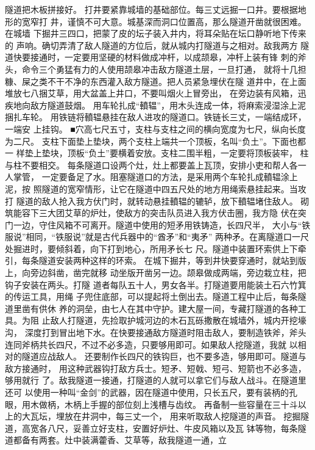 \documentclass[12pt,UTF8]{ctexbook}
\begin{document}
隧道把木板拼接好。 
打井要紧靠城墙的基础部位。每三丈远掘一口井。要根据地形的宽窄打 
井，谨慎不可大意。城基深而洞口位置高，那么隧道开凿就很困难。在城墙 
下掘井三四口，把蒙了皮的坛子装入井内，将耳朵贴在坛口静听地下传来的 
声响。确切弄清了敌人隧道的方位后，就从城内打隧道与之相对。敌我两方 
隧道快要接通时，一定要用坚硬的材料做成冲杆，以成颉皋，冲杆上装有锋 
刺的斧头，命令三个勇猛有力的人使用颉皋冲击敌方隧道土层，一旦打通， 
就将十几担糠、屎之类不干不净的东西灌入敌方隧道。把人员紧急埋伏在隧 
道井中，在上面堆放七八捆艾草，用大盆盖上井口，不要叫烟火上冒旁出， 
在旁边装有风箱，迅疾地向敌方隧道鼓烟。 
用车轮扎成“轒辒”，用木头连成一体，将麻索浸湿涂上泥捆扎车轮。 
用铁链将轒辒悬挂在敌人进攻的隧道口。铁链长三丈，一端结成环，一端安 
上挂钩。 
■穴高七尺五寸，支柱与支柱之间的横向宽度为七尺，纵向长度为二尺。 
支柱下面垫上垫块，两个支柱上端共一个顶板，名叫“负土”。下面也都一 
样垫上垫块，顶板“负土”要横着安放。支柱二围半粗，一定要将顶板装牢， 
柱与柱不要相交。 
每条隧道口设两个灶，灶上都要盖上瓦顶，安排小吏和帮人各一人掌管， 
一定要备足了水。阻塞隧道口的方法，是采用两个车轮扎成轒辒涂上泥，按 
照隧道的宽窄情形，让它在隧道中四五尺处的地方用绳索悬挂起来。当攻打 
隧道的敌人抢入我方伏门时，就转动悬挂轒辒的辘轳，放下轒辒堵住敌人。 
砌筑能容下三大团艾草的炉灶，使敌方的突击队员进入我方伏击圈，我方隐 
伏在突门一边，守住风箱不可离开。隧道中使用的短矛用铁铸造，长四尺半， 
大小与“铁服说”相同，“铁服说”就是古代兵器中的“酋矛”和“夷矛” 
两种矛。在离隧道口一尺处掘进时，要倾斜着，向下打到地心，所用矛长七 
尺。隧道中装置环索供上下牵引，每条隧道安装两种这样的环索。 
在城下掘井，等到井快要穿通时，就站到版上，向旁边斜凿，凿完就移 
动坐版开凿另一边。颉皋做成两端，旁边栽立柱，把钩子安装在两头。打隧 
道者每队五十人，男女各半。打隧道要用能装土石六竹箕的传运工具，用绳 
子兜住底部，可以提起将土倒出去。隧道工程中止后，每条隧道里凿有供休 
养的洞垒，由七人在其中守护。建大屋一间，专藏打隧道的各种工具。为阻 
止敌人打隧道，先捡取护城河边的木石瓦砾撒散在城墙外，城内开挖壕沟， 
深度打到冒出地下水。在快要接通敌方隧道时阻击敌人，要制造铁斧，斧头 
连同斧柄共长四尺，不过不必多造，只要够用即可。如果敌人挖隧道，我就 
以相对的隧道应战敌人。 
还要制作长四尺的铁钩巨，也不要多造，够用即可。隧道与敌方接通时， 
用这种武器钩打敌方兵士。短矛、短戟、短弓、短箭也不必多造，够用就行 
了。敌我隧道一接通，打隧道的人就可以拿它们与敌人战斗。在隧道里还可 
以使用一种叫“金剑”的武器，因在隧道中使用，只长五尺，要有装柄的孔 
眼，用木做柄，木柄上手握的部位刻上浅槽与齿纹。 
再备制一些容量在三十斗以上的大瓦坛，埋放在井洞中，每三丈一个， 
用来听取敌人挖隧道的声音。 
挖掘隧道，高宽各八尺，妥善立好支柱，安置好炉灶、牛皮风箱以及瓦 
钵等物，每条隧道都备有两套。灶中装满藿香、艾草等，敌我隧道一通，立 
\end{document}
